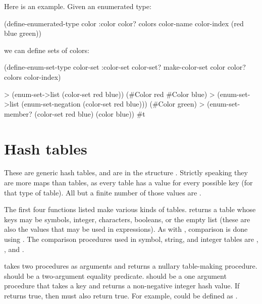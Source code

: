 Here is an example.  Given an enumerated type:

\begin{example}
(define-enumerated-type color :color
  color?
  colors
  color-name
  color-index
  (red blue green))
\end{example}

we can define sets of colors:

\begin{example}
(define-enum-set-type color-set :color-set
                      color-set?
                      make-color-set
  color color? colors color-index)
\end{example}

\begin{example}
> (enum-set->list (color-set red blue))
(#\ob{}Color red\cb{} #\ob{}Color blue\cb{})
> (enum-set->list (enum-set-negation (color-set red blue)))
(#\ob{}Color green\cb{})
> (enum-set-member? (color-set red blue) (color blue))
#t
\end{example}

\section{Hash tables}

These are generic hash tables, and are in the structure .
Strictly speaking they are more maps than tables, as every table has a
 value for every possible key (for that type of table).
All but a finite number of those values are .

\begin{protos}
\end{protos}
\noindent
The first four functions listed make various kinds of tables.
 returns a table whose keys may be symbols, integer,
 characters, booleans, or the empty list (these are also the values
 that may be used in  expressions).
As with , comparison is done using .
The comparison procedures used in symbol, string, and integer tables are
 , , and \code{=}.

 takes two procedures as arguments and returns
 a nullary table-making procedure.
 should be a two-argument equality predicate.
 should be a one argument procedure that takes a key
 and returns a non-negative integer hash value.
If  returns true,
 then 
 must also return true.
For example,  could be defined
 as .

